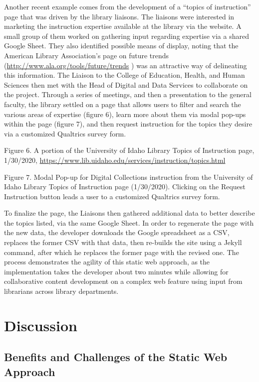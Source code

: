 \documentclass{book}
\begin{document}
Another recent example comes from the development of a ``topics of
instruction'' page that was driven by the library liaisons. The liaisons were
interested in marketing the instruction expertise available at the library via
the website. A small group of them worked on gathering input regarding
expertise via a shared Google Sheet. They also identified possible means of
display, noting that the American Library Association's page on future trends
(\url{http://www.ala.org/tools/future/trends} ) was an attractive way of
delineating this information. The Liaison to the College of Education, Health,
and Human Sciences then met with the Head of Digital and Data Services to
collaborate on the project. Through a series of meetings, and then a
presentation to the general faculty, the library settled on a page that allows
users to filter and search the various areas of expertise (figure 6), learn
more about them via modal pop-ups within the page (figure 7), and then request
instruction for the topics they desire via a customized Qualtrics survey form.

Figure 6. A portion of the University of Idaho Library Topics of Instruction
page, 1/30/2020,
\url{https://www.lib.uidaho.edu/services/instruction/topics.html}

Figure 7. Modal Pop-up for Digital Collections instruction from the University
of Idaho Library Topics of Instruction page (1/30/2020). Clicking on the
Request Instruction button leads a user to a customized Qualtrics survey form.

To finalize the page, the Liaisons then gathered additional data to better
describe the topics listed, via the same Google Sheet. In order to regenerate
the page with the new data, the developer downloads the Google spreadsheet as
a CSV, replaces the former CSV with that data, then re-builds the site using a
Jekyll command, after which he replaces the former page with the revised one.
The process demonstrates the agility of this static web approach, as the
implementation takes the developer about two minutes while allowing for
collaborative content development on a complex web feature using input from
librarians across library departments.

\hypertarget{discussion}{%
\chapter{Discussion}\label{discussion}}

\hypertarget{benefits-and-challenges-of-the-static-web-approach}{%
\section{Benefits and Challenges of the Static Web
Approach}\label{benefits-and-challenges-of-the-static-web-approach}}
\end{document}
